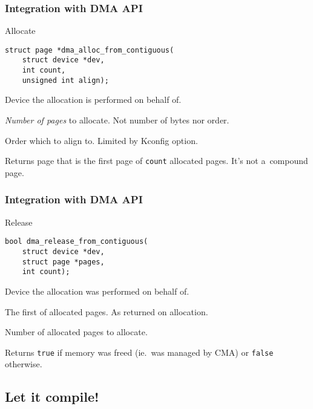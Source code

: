 \begin{frame}[fragile]
  \frametitle{Integration with DMA API}

  \begin{block}{Allocate}
\begin{lstlisting}
struct page *dma_alloc_from_contiguous(
    struct device *dev,
    int count,
    unsigned int align);
\end{lstlisting}
  \end{block}

  \begin{description}[count]
  \item[dev] Device the allocation is performed on behalf of.
  \item[count] \emph{Number of pages} to allocate. {\footnotesize Not
    number of bytes nor order.}
  \item[align] Order which to align to.  Limited by Kconfig option.
  \item Returns page that is the first page of \lstinline|count|
    allocated pages. {\footnotesize It's not a~compound page.}
  \end{description}
\end{frame}

\begin{frame}[fragile]
  \frametitle{Integration with DMA API}

  \begin{block}{Release}
\begin{lstlisting}
bool dma_release_from_contiguous(
    struct device *dev,
    struct page *pages,
    int count);
\end{lstlisting}
  \end{block}

  \begin{description}[count]
  \item[dev] Device the allocation was performed on behalf of.
  \item[pages] The first of allocated pages. {\footnotesize As
    returned on allocation.}
  \item[count] Number of allocated pages to allocate.
  \item Returns \lstinline|true| if memory was freed (ie.\ was managed
    by CMA) or \lstinline|false| otherwise.
  \end{description}
\end{frame}

\subsection{Let it compile!}

